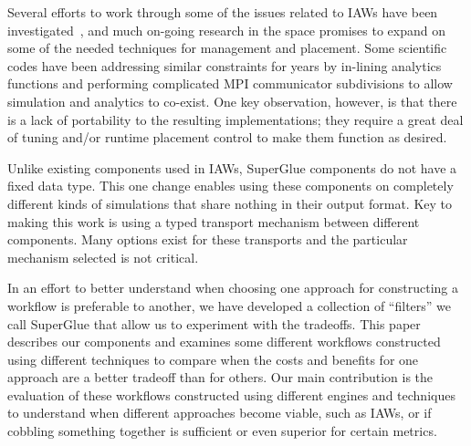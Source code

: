 Several efforts to work through some of the issues related to IAWs have been
investigated~\cite{karimabadi:2013:catalyst,whitlock:2011:libsim,Glean,dayal:2014:flexpath,dreher:2016:bredala,zheng:2010:predata},
and much on-going research in the space promises to expand on some of the
needed techniques for management and placement.  Some
scientific codes have been addressing similar constraints for years by
in-lining analytics functions and performing complicated MPI communicator
subdivisions to allow simulation and analytics to co-exist.  One key
observation, however, is that there is a lack of portability to the resulting
implementations; they require a great deal of tuning and/or runtime placement
control to make them function as desired.
\fi


Unlike existing components used in IAWs, SuperGlue
components do not have a fixed data type. 
 This one change enables using these
components on completely different kinds of simulations that share nothing in
their output format. Key to making this work is using a typed transport
mechanism between different components. Many options exist for these transports
and the particular mechanism selected is not critical. 

In an effort to better understand when choosing one approach for constructing a
workflow is preferable to another, we have developed a collection of ``filters''
we call SuperGlue that allow us to experiment with the tradeoffs. This paper
describes our components and examines some different workflows constructed using
different techniques to compare when the costs and benefits for one approach are
a better tradeoff than for others. 
Our main contribution is the evaluation of
these workflows constructed using different engines and techniques to understand
when different approaches become viable, such as IAWs, or if cobbling something
together is sufficient or even superior for certain metrics.


